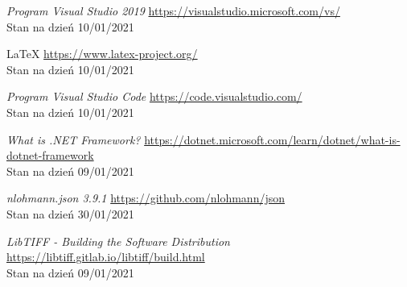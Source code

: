 \documentclass{article}
\begin{document}
\begin{thebibliography}{9}
        \textit{Program Visual Studio 2019}
        \url{https://visualstudio.microsoft.com/vs/}\\
        Stan na dzień 10/01/2021

        \LaTeX \space
        \url{https://www.latex-project.org/}\\
        Stan na dzień 10/01/2021

        \textit{Program Visual Studio Code}
        \url{https://code.visualstudio.com/}\\
        Stan na dzień 10/01/2021

        \textit{What is .NET Framework?}
        \url{https://dotnet.microsoft.com/learn/dotnet/what-is-dotnet-framework}\\
        Stan na dzień 09/01/2021

        \textit{nlohmann.json 3.9.1}
        \url{https://github.com/nlohmann/json}\\
        Stan na dzień 30/01/2021

        \textit{LibTIFF - Building the Software Distribution}
        \url{https://libtiff.gitlab.io/libtiff/build.html}\\
        Stan na dzień 09/01/2021

    \end{thebibliography}
    \newpage
    \listoffigures
\end{document}
